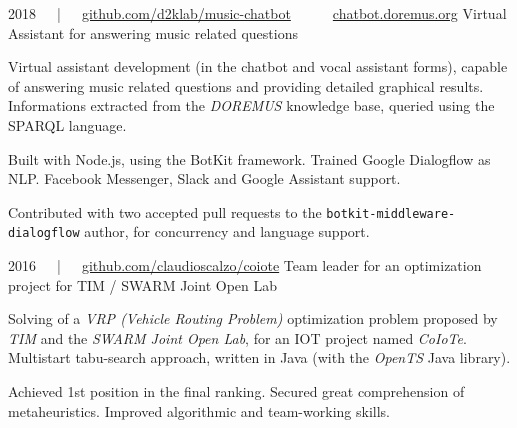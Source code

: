 



\begin{cventries}

	\cvproj
        {2018~~~|~~~\href{https://github.com/D2KLab/music-chatbot}{github.com/d2klab/music-chatbot}~~~\textbullet~~~\href{https://chatbot.doremus.org}{chatbot.doremus.org}}
        {Virtual Assistant for answering music related questions}
        {}
        {}
        {
            \begin{cvitems} %
                \item {Virtual assistant development (in the chatbot and vocal assistant forms), capable of answering music related questions and providing detailed graphical results. Informations extracted from the \textit{DOREMUS} knowledge base, queried using the SPARQL language.}
                \item {Built with Node.js, using the BotKit framework. Trained Google Dialogflow as NLP. Facebook Messenger, Slack and Google Assistant support.}
                \item {Contributed with two accepted pull requests to the \texttt{botkit-middleware-dialogflow} author, for concurrency and language support.}
            \end{cvitems}
        }

	\cvproj
		{2016~~~|~~~\href{https://github.com/claudioscalzo/coiote}{github.com/claudioscalzo/coiote}}
		{Team leader for an optimization project for TIM / SWARM Joint Open Lab}
		{}
		{}
		{
			\begin{cvitems} %
				\item {Solving of a \textit{VRP (Vehicle Routing Problem)} optimization problem proposed by \textit{TIM} and the \textit{SWARM Joint Open Lab}, for an IOT project named \textit{CoIoTe}. Multistart tabu-search approach, written in Java (with the \textit{OpenTS} Java library).}
				\item {Achieved 1st position in the final ranking. Secured great comprehension of metaheuristics. Improved algorithmic and team-working skills.}
			\end{cvitems}
		}
	

\end{cventries}
